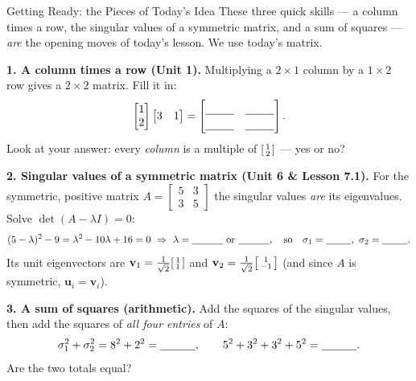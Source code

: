 \documentclass[10pt]{article}
\newcommand{\uu}{\mathbf{u}}
\newcommand{\vv}{\mathbf{v}}
\begin{document}
\namedateperiod

\vspace{0.12in}

\begin{notesbox}{Getting Ready: the Pieces of Today's Idea}
\small These three quick skills --- a column times a row, the singular values of a symmetric matrix,
and a sum of squares --- \emph{are} the opening moves of today's lesson. We use today's matrix.

\vspace{4pt}
\textbf{1. A column times a row (Unit 1).} Multiplying a $2\times1$ column by a $1\times2$ row gives a
$2\times2$ matrix. Fill it in:
\[
  \begin{bmatrix} 1 \\ 2 \end{bmatrix}\begin{bmatrix} 3 & 1 \end{bmatrix}
  =\begin{bmatrix}\rule{0pt}{1.1em}\blank{0.9cm} & \blank{0.9cm}\\[2pt]\blank{0.9cm} & \blank{0.9cm}\end{bmatrix}.
\]
Look at your answer: every \emph{column} is a multiple of $\begin{bsmallmatrix} 1\\2 \end{bsmallmatrix}$
--- yes or no? \blank{1.6cm}

\vspace{4pt}
\textbf{2. Singular values of a symmetric matrix (Unit 6 \& Lesson 7.1).} For the symmetric, positive
matrix $A=\begin{bmatrix} 5 & 3\\ 3 & 5 \end{bmatrix}$ the singular values \emph{are} its eigenvalues.
Solve $\det(A-\lambda I)=0$:
\[
  (5-\lambda)^2-9=\lambda^2-10\lambda+16=0 \ \Rightarrow\ \lambda=\blank{1.1cm}\ \text{or}\ \blank{1.1cm},
  \quad\text{so}\quad \sigma_1=\blank{0.9cm},\ \sigma_2=\blank{0.9cm}.
\]
Its unit eigenvectors are $\vv_1=\tfrac1{\sqrt2}\begin{bsmallmatrix} 1\\1 \end{bsmallmatrix}$ and
$\vv_2=\tfrac1{\sqrt2}\begin{bsmallmatrix} 1\\-1 \end{bsmallmatrix}$ (and since $A$ is symmetric, $\uu_i=\vv_i$).

\vspace{4pt}
\textbf{3. A sum of squares (arithmetic).} Add the squares of the singular values, then add the squares
of \emph{all four entries} of $A$:
\[
  \sigma_1^2+\sigma_2^2=8^2+2^2=\blank{1.1cm},\qquad
  5^2+3^2+3^2+5^2=\blank{1.1cm}.
\]
Are the two totals equal? \blank{1.6cm}
\end{notesbox}
\end{document}
